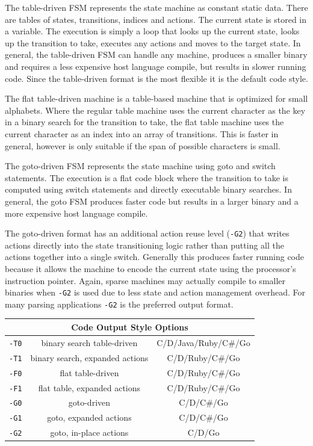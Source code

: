 \documentclass[letterpaper,11pt,oneside]{book}
\newcommand{\verbspace}{\vspace{10pt}}
\begin{document}
The table-driven FSM represents the state machine as constant static data. There are
tables of states, transitions, indices and actions. The current state is
stored in a variable. The execution is simply a loop that looks up the current
state, looks up the transition to take, executes any actions and moves to the
target state. In general, the table-driven FSM can handle any machine, produces
a smaller binary and requires a less expensive host language compile, but
results in slower running code.  Since the table-driven format is the most
flexible it is the default code style.

The flat table-driven machine is a table-based machine that is optimized for
small alphabets. Where the regular table machine uses the current character as
the key in a binary search for the transition to take, the flat table machine
uses the current character as an index into an array of transitions. This is
faster in general, however is only suitable if the span of possible characters
is small.

The goto-driven FSM represents the state machine using goto and switch
statements. The execution is a flat code block where the transition to take is
computed using switch statements and directly executable binary searches.  In
general, the goto FSM produces faster code but results in a larger binary and a
more expensive host language compile.

The goto-driven format has an additional action reuse level (\verb|-G2|) that
writes actions directly into the state transitioning logic rather than putting
all the actions together into a single switch. Generally this produces faster
running code because it allows the machine to encode the current state using
the processor's instruction pointer. Again, sparse machines may actually
compile to smaller binaries when \verb|-G2| is used due to less state and
action management overhead. For many parsing applications \verb|-G2| is the
preferred output format.

\verbspace
\begin{center}
\begin{tabular}{|c|c|c|}
\hline
\multicolumn{3}{|c|}{\bf Code Output Style Options} \\
\hline
\verb|-T0|&binary search table-driven&C/D/Java/Ruby/C\#/Go\\
\hline
\verb|-T1|&binary search, expanded actions&C/D/Ruby/C\#/Go\\
\hline
\verb|-F0|&flat table-driven&C/D/Ruby/C\#/Go\\
\hline
\verb|-F1|&flat table, expanded actions&C/D/Ruby/C\#/Go\\
\hline
\verb|-G0|&goto-driven&C/D/C\#/Go\\
\hline
\verb|-G1|&goto, expanded actions&C/D/C\#/Go\\
\hline
\verb|-G2|&goto, in-place actions&C/D/Go\\
\hline
\end{tabular}
\end{center}
\end{document}
